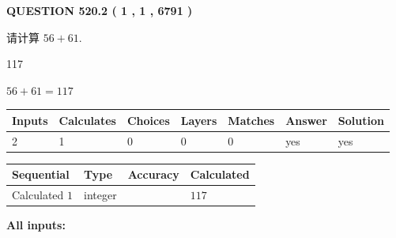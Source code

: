 \documentclass{ctexart}
\begin{document}
   
  
\vspace{0.2in}
  
{\textbf{\Large{QUESTION
520.2 
 ( 1 , 1 , 6791 )
}}}
  
  
 
请计算 $ %
56 +  %
61 $.
 
 
 
\noindent{}
 
 

117
 
 
\noindent{}
 
 

 
 
 
\noindent{}
 
 

$ %
56 +  %
61=   %
117$
 
 
\noindent{}
 
 

 
   
   
   
   
\noindent\begin{tabular}{|l|l|l|l|l|l|l|}
 \hline
Inputs & Calculates & Choices & Layers & Matches & Answer & Solution \\ \hline
 2  & 
 1  & 
 0
  & 
 0  & 
 0  & 
  yes & 
  yes 
  \\ \hline
 \end{tabular}
   
   
   
   
\noindent{}
   
   
  
  
\noindent\begin{tabular}{|l|l|l|l|}
\hline
 Sequential & Type & Accuracy & Calculated \\ 
\hline
 
 
  Calculated $  1 $ & integer &  & 
  $ 117 $ 
 \\  \hline  
 \end{tabular}
   
   
   
   
\noindent\vspace{0.1in}\hspace{-0.08in} {\textbf{\Large{All inputs: }}}
   
\end{document}
